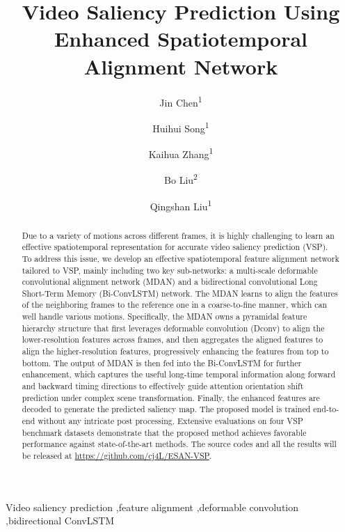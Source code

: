 \documentclass[review]{elsarticle}
\begin{document}
\begin{frontmatter}

\title{Video Saliency Prediction Using Enhanced Spatiotemporal Alignment Network}
\author[]{Jin Chen\textsuperscript{\rm 1}}
\author[]{Huihui Song\textsuperscript{\rm 1}}
\author[]{Kaihua Zhang\textsuperscript{\rm 1}}
\author[]{Bo Liu\textsuperscript{\rm 2}}
\author[]{Qingshan Liu\textsuperscript{\rm 1}}

\address{\textsuperscript{\rm 1}B-DAT,CICAEET, Nanjing University of Information Science and Technology, Nanjing, China\\
\textsuperscript{\rm 2}JD Finance America Corporation}
\begin{abstract}
Due to a variety of motions across different frames, it is highly challenging to learn an effective spatiotemporal representation for accurate video saliency prediction (VSP).
To address this issue, we develop an effective spatiotemporal feature alignment network tailored to VSP, mainly including two key sub-networks: a multi-scale deformable convolutional alignment network (MDAN) and a bidirectional convolutional Long Short-Term Memory (Bi-ConvLSTM) network.
The MDAN learns to align the features of the neighboring frames to the reference one in a coarse-to-fine manner, which can well handle various motions.
Specifically, the MDAN owns a pyramidal feature hierarchy structure that first leverages deformable convolution (Dconv) to align the lower-resolution features across frames, and then aggregates the aligned features to align the higher-resolution features, progressively enhancing the features from top to bottom.
The output of MDAN is then fed into the Bi-ConvLSTM for further enhancement, which captures the useful long-time temporal information along forward and backward timing directions to effectively guide attention orientation shift prediction under complex scene transformation.
Finally, the enhanced features are decoded to generate the predicted saliency map.
The proposed model is trained end-to-end without any intricate post processing.
Extensive evaluations on four VSP benchmark datasets demonstrate that the proposed method achieves favorable performance against state-of-the-art methods.
The source codes and all the results will be released at \url{https://github.com/cj4L/ESAN-VSP}.
\end{abstract}

\begin{keyword}
Video saliency prediction \sep feature alignment \sep deformable convolution \sep bidirectional ConvLSTM
\end{keyword}

\end{frontmatter}
\end{document}
